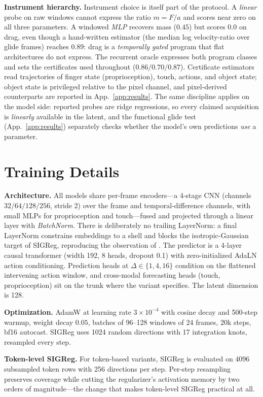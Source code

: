 \documentclass{article} %
\begin{document}
\textbf{Instrument hierarchy.} Instrument choice is itself part of the
protocol. A \emph{linear} probe on raw windows cannot express the ratio
$m = F/a$ and scores near zero on all three parameters. A windowed
\emph{MLP} recovers mass ($0.45$) but scores $0.0$ on drag, even though a
hand-written estimator (the median log velocity-ratio over glide frames)
reaches $0.89$: drag is a \emph{temporally gated} program that flat
architectures do not express. The recurrent oracle expresses both program
classes and sets the certificates used throughout ($0.86/0.70/0.87$).
Certificate estimators read trajectories of finger state (proprioception),
touch, actions, and object state; object state is privileged relative to
the pixel channel, and pixel-derived counterparts are reported in
App.~\ref{app:results}. The same discipline applies on the model side: reported probes are ridge
regressions, so every claimed acquisition is \emph{linearly} available in
the latent, and the functional glide test (App.~\ref{app:results})
separately checks whether the model's own predictions \emph{use} a
parameter.

\section{Training Details}
\label{app:training}

\textbf{Architecture.} All models share per-frame encoders---a 4-stage CNN
(channels $32/64/128/256$, stride 2) over the frame and temporal-difference
channels, with small MLPs for proprioception and touch---fused and projected
through a linear layer with \emph{BatchNorm}. There is deliberately no
trailing LayerNorm: a final LayerNorm constrains embeddings to a shell and
blocks the isotropic-Gaussian target of SIGReg, reproducing the observation
of \citet{maes2026lewm}. The predictor is a 4-layer causal transformer
(width 192, 8 heads, dropout 0.1) with zero-initialized AdaLN action
conditioning. Prediction heads at $\Delta \in \{1,4,16\}$ condition on the
flattened intervening action window, and cross-modal forecasting heads
(touch, proprioception) sit on the trunk where the variant specifies. The
latent dimension is 128.

\textbf{Optimization.} AdamW at learning rate $3{\times}10^{-4}$ with cosine
decay and 500-step warmup, weight decay $0.05$, batches of 96--128 windows
of 24 frames, 20k steps, bf16 autocast. SIGReg uses 1024 random directions
with 17 integration knots, resampled every step.

\textbf{Token-level SIGReg.} For token-based variants, SIGReg is evaluated
on 4096 subsampled token rows with 256 directions per step. Per-step
resampling preserves coverage while cutting the regularizer's activation
memory by two orders of magnitude---the change that makes token-level SIGReg
practical at all.
\end{document}
